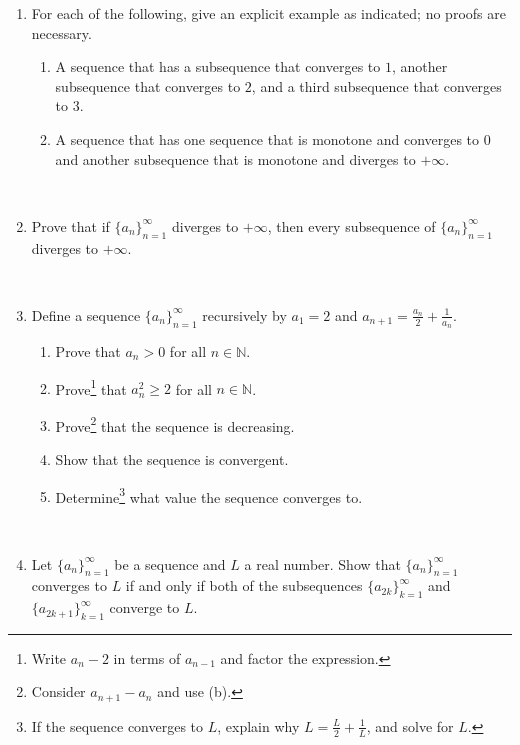 \documentclass{amsart}
\def\N{\mathbb N}
\begin{document}
\begin{enumerate}

\item For each of the following, give an explicit example as indicated; no proofs are necessary.
\begin{enumerate}
\item A sequence that has a subsequence that converges to $1$, another subsequence that converges to $2$, and a third subsequence that converges to $3$. 
\item A sequence that has one sequence that is monotone and converges to $0$ and another subsequence that is monotone and diverges to $+\infty$.
\end{enumerate}

\


\item Prove that if $\{a_n\}_{n=1}^\infty$ diverges to $+\infty$, then every subsequence of $\{a_n\}_{n=1}^\infty$ diverges to $+\infty$.

\

\item Define a sequence $\{a_n\}_{n=1}^\infty$ recursively by $a_1=2$ and $\displaystyle a_{n+1} = \frac{a_{n}}{2} + \frac{1}{a_{n}}$.
\begin{enumerate}
\item Prove that $a_n>0$ for all $n\in \N$.
\item Prove\footnote{Write $a_{n}-2$ in terms of $a_{n-1}$ and factor the expression.} that $a_n^2 \geq 2$ for all $n\in \N$.
\item Prove\footnote{Consider $a_{n+1}-a_n$ and use (b).} that the sequence is decreasing.
\item Show that the sequence is convergent.
\item Determine\footnote{If the sequence converges to $L$, explain why $L = \frac{L}{2} + \frac{1}{L}$, and solve for $L$.} what value the sequence converges to.
\end{enumerate}

\

\item Let $\{a_n\}_{n=1}^\infty$ be a sequence and $L$ a real number. Show that $\{a_n\}_{n=1}^\infty$ converges to $L$ if and only if both of the subsequences $\{a_{2k}\}_{k=1}^\infty$ and $\{a_{2k+1}\}_{k=1}^\infty$ converge to $L$.


\end{enumerate}
\end{document}
